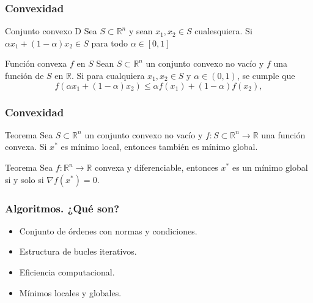 \documentclass{beamer}
\begin{document}
\begin{frame}
    \frametitle{Convexidad}
    \begin{block}
        {Conjunto convexo D} Sea $S\subset \mathbb{R}^n$ y sean $x_1, x_2 \in S$ cualesquiera. Si
        $\alpha x_1 + (1 - \alpha)x_2 \in S$ para todo $\alpha \in [0,1]$
    \end{block}
    \begin{block}
        {Función convexa $f$ en $S$} 
        Sean $S \subset \mathbb{R}^n$ un conjunto convexo no vacío y $f$ una función de $S$ en $\mathbb{R}$.
        Si para cualquiera $x_1, x_2 \in S$ y
        $\alpha \in (0,1)$, se cumple que
        \begin{equation*}
            f(\alpha x_1 + (1-\alpha)x_2) \leq \alpha f(x_1) + (1-\alpha)f(x_2),
        \end{equation*}
    \end{block}
\end{frame}
\begin{frame}
    \frametitle{Convexidad}
    \begin{block}{Teorema}
        Sea $S \subset \mathbb{R}^n$ un conjunto convexo no vacío y
        $f:S \subset \mathbb{R}^n \rightarrow \mathbb{R}$ una función convexa. Si $x^*$ es mínimo
        local, entonces también es mínimo global.
    \end{block}
    \begin{block}{Teorema}
        Sea $f: \mathbb{R}^n \rightarrow \mathbb{R}$ convexa y diferenciable, entonces $x^*$ es un
        mínimo global si y solo si $\nabla f(x^*) = 0$.
    \end{block}
\end{frame}
\begin{frame}
    \frametitle{Algoritmos. ¿Qué son?}
    \begin{itemize}[label=\textbullet]
        \item Conjunto de órdenes con normas y condiciones. \pause
        \item Estructura de bucles iterativos. \pause
        \item Eficiencia computacional. \pause
        \item Mínimos locales y globales.
    \end{itemize}
\end{frame}
\end{document}
